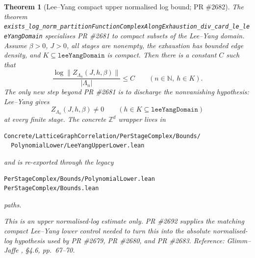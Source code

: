 \documentclass[a4paper,11pt]{article}
\newtheorem{theorem}{Theorem}
\begin{document}
\begin{theorem}[Lee--Yang compact upper normalised log bound; PR \#2682]
The theorem
\texttt{exists\_log\_norm\_partitionFunctionComplexAlongExhaustion\_div\_card\_le\_leeYangDomain}
specialises PR \#2681 to compact subsets of the Lee--Yang domain.  Assume
$\beta>0$, $J>0$, all stages are nonempty, the exhaustion has bounded edge
density, and $K\subseteq\texttt{leeYangDomain}$ is compact.  Then there is a
constant $C$ such that
\[
  \frac{\log\|Z_{\Lambda_n}(J,h,\beta)\|}{|\Lambda_n|}\le C
  \qquad(n\in\mathbb N,\ h\in K).
\]
The only new step beyond PR \#2681 is to discharge the nonvanishing hypothesis:
Lee--Yang gives
\[
  Z_{\Lambda_n}(J,h,\beta)\ne 0
  \qquad(h\in K\subseteq\texttt{leeYangDomain})
\]
at every finite stage.  The concrete $\mathbb Z^d$ wrapper lives in
\begin{Verbatim}[fontsize=\footnotesize]
Concrete/LatticeGraphCorrelation/PerStageComplex/Bounds/
  PolynomialLower/LeeYangUpperLower.lean
\end{Verbatim}
and is re-exported through the legacy
\begin{Verbatim}[fontsize=\footnotesize]
PerStageComplex/Bounds/PolynomialLower.lean
PerStageComplex/Bounds.lean
\end{Verbatim}
paths.

This is an upper normalised-log estimate only.  PR \#2692 supplies the matching
compact Lee--Yang lower control needed to turn this into the absolute
normalised-log hypothesis used by PR \#2679, PR \#2680, and PR \#2683.
Reference: Glimm--Jaffe \cite{glimm-jaffe}, \S 4.6, pp.~67--70.
\end{theorem}
\end{document}
